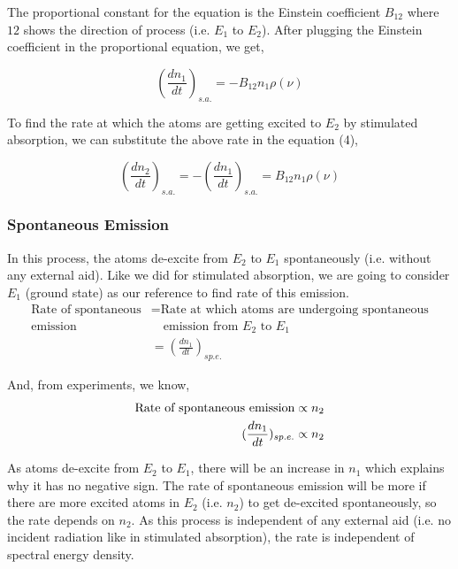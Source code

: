 \documentclass[12pt]{article}
\begin{document}
The proportional constant for the equation is the Einstein coefficient $B_{12}$ where $12$ shows the direction of process (i.e. $E_{1}$ to $E_{2}$). After plugging the Einstein coefficient in the proportional equation, we get,

\begin{equation}
    (\frac{dn_{1}}{dt})_{s.a.} = -B_{12}n_{1}\rho(\nu) 
\end{equation}

To find the rate at which the atoms are getting excited to $E_{2}$ by stimulated absorption, we can substitute the above rate in the equation (4),

\begin{equation*}
    (\frac{dn_{2}}{dt})_{s.a.} = -(\frac{dn_{1}}{dt})_{s.a.} = B_{12}n_{1}\rho(\nu)
\end{equation*}

\subsubsection{Spontaneous Emission}

In this process, the atoms de-excite from $E_{2}$ to $E_{1}$ spontaneously (i.e. without any external aid). Like we did for stimulated absorption, we are going to consider $E_{1}$ (ground state) as our reference to find rate of this emission.
\begin{align*}
    \text{Rate of spontaneous} & = \text{Rate at which atoms are undergoing spontaneous} \\
    \text{emission} & \quad \text{emission from } E_{2} \text{ to } E_{1} \\ 
    & = (\frac{dn_{1}}{dt})_{sp.e.}
\end{align*}

And, from experiments, we know, 
\begin{align*}
    \textnormal{Rate of spontaneous emission} \propto n_{2} \\ 
    (\frac{dn_{1}}{dt})_{sp.e.} \propto n_{2}
\end{align*}

As atoms de-excite from $E_{2}$ to $E_{1}$, there will be an increase in $n_{1}$ which explains why it has no negative sign. The rate of spontaneous emission will be more if there are more excited atoms in $E_{2}$ (i.e. $n_{2}$) to get de-excited spontaneously, so the rate depends on $n_{2}$. As this process is independent of any external aid (i.e. no incident radiation like in stimulated absorption), the rate is independent of spectral energy density. \vspace{.2cm}
\end{document}
